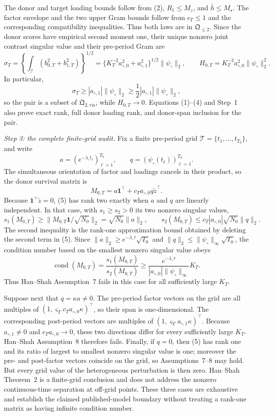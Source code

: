 The donor and target loading bounds follow from (2), \(R_1\le M_z\), and
\(\bar h\le M_\star\).  The factor envelope and the two upper Gram bounds
follow from \(c_T\le1\) and the corresponding compatibility inequalities.
Thus both laws are in \(\mathfrak Q_{\leq2}\).  Since the donor scores have
empirical second moment one, their unique nonzero joint contrast singular
value and their pre-period Gram are
\[
 \sigma_T
 =\left\{\int_{\mathcal I}(b_{0,T}^2+b_{1,T}^2)\right\}^{1/2}
 =\{K_T^{-2}a_{\circ,0}^2+a_{\circ,1}^2\}^{1/2}
   \|\psi_\circ\|_2,
 \qquad
 H_{0,T}=K_T^{-2}a_{\circ,0}^2\|\psi_\circ\|_2^2.     \tag{3}
\]
In particular,
\[
 \sigma_T\ge |a_{\circ,1}|\|\psi_\circ\|_2
 \ge\frac12|a_{\circ,1}|\|\psi_\circ\|_2,            \tag{4}
\]
so the pair is a subset of \(\mathfrak Q_{2,\mathrm{vis}}\), while
\(H_{0,T}\to0\).  Equations (1)--(4) and Step~1 also prove exact rank,
full donor loading rank, and donor-span inclusion for the pair.

\emph{Step 3: the complete finite-grid audit.}
Fix a finite pre-period grid
\(\mathcal T=\{t_1,\ldots,t_{T_0}\}\), and write
\[
 a=(e^{-\lambda_\circ t_\ell})_{\ell=1}^{T_0},
 \qquad q=(\psi_\circ(t_\ell))_{\ell=1}^{T_0}.
\]
The simultaneous orientation of factor and loadings cancels in their
product, so the donor survival matrix is
\[
 M_{0,T}=a\mathbf1^\top+c_Ta_{\circ,0}q\widetilde z^\top. \tag{5}
\]
Because \(\mathbf1^\top\widetilde z=0\), (5) has rank two exactly when
\(a\) and \(q\) are linearly independent.  In that case, with
\(s_1\ge s_2>0\) its two nonzero singular values,
\[
 s_1(M_{0,T})
 \ge\|M_{0,T}\mathbf1/\sqrt{N_0}\|_2
 =\sqrt{N_0}\|a\|_2,
 \qquad
 s_2(M_{0,T})
 \le c_T|a_{\circ,0}|\sqrt{N_0}\|q\|_2.              \tag{6}
\]
The second inequality is the rank-one approximation bound obtained by
deleting the second term in (5).  Since
\(\|a\|_2\ge e^{-\lambda_\circ\bar\tau}\sqrt{T_0}\) and
\(\|q\|_2\le\|\psi_\circ\|_\infty\sqrt{T_0}\), the condition number
based on the smallest nonzero singular value obeys
\[
 \operatorname{cond}(M_{0,T})
 =\frac{s_1(M_{0,T})}{s_2(M_{0,T})}
 \ge
 \frac{e^{-\lambda_\circ\bar\tau}}
 {|a_{\circ,0}|\|\psi_\circ\|_\infty}K_T.             \tag{7}
\]
Thus Han--Shah Assumption~7 fails in this case for all sufficiently large
\(K_T\).

Suppose next that \(q=\kappa a\ne0\).  The pre-period factor vectors on
the grid are all multiples of
\((1,\varsigma_Tc_Ta_{\circ,0}\kappa)^\top\), so their span is
one-dimensional.  The corresponding post-period vectors are multiples of
\((1,\varsigma_Ta_{\circ,1}\kappa)^\top\).  Because
\(a_{\circ,1}\ne0\) and \(c_Ta_{\circ,0}\to0\), these two directions
differ for every sufficiently large \(K_T\).  Han--Shah Assumption~8
therefore fails.  Finally, if \(q=0\), then (5) has rank one and its ratio
of largest to smallest nonzero singular value is one; moreover the pre-
and post-factor vectors coincide on the grid, so Assumptions~7--8 may
hold.  But every grid value of the heterogeneous perturbation is then
zero.  Han--Shah Theorem~2 is a finite-grid conclusion and does not
address the nonzero continuous-time separation at off-grid points.  These
three cases are exhaustive and establish the claimed published-model
boundary without treating a rank-one matrix as having infinite condition
number.

